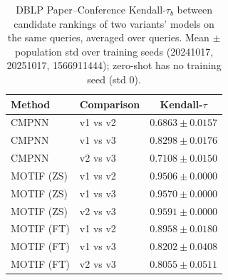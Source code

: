 \begin{table}[t]
\centering
\small
\begin{tabular}{||l||l||c||}
\hline
\textbf{Method} & \textbf{Comparison} & \textbf{Kendall-$\tau$} \\
\hline\hline
CMPNN & v1 vs v2 & $0.6863 \pm 0.0157$ \\
\hline
CMPNN & v1 vs v3 & $0.8298 \pm 0.0176$ \\
\hline
CMPNN & v2 vs v3 & $0.7108 \pm 0.0150$ \\
\hline
\hline
MOTIF (ZS) & v1 vs v2 & $0.9506 \pm 0.0000$ \\
\hline
MOTIF (ZS) & v1 vs v3 & $0.9570 \pm 0.0000$ \\
\hline
MOTIF (ZS) & v2 vs v3 & $0.9591 \pm 0.0000$ \\
\hline
\hline
MOTIF (FT) & v1 vs v2 & $0.8958 \pm 0.0180$ \\
\hline
MOTIF (FT) & v1 vs v3 & $0.8202 \pm 0.0408$ \\
\hline
MOTIF (FT) & v2 vs v3 & $0.8055 \pm 0.0511$ \\
\hline
\end{tabular}
\caption{DBLP Paper--Conference Kendall-$\tau_b$ between candidate rankings of two variants' models on the same queries, averaged over queries. Mean $\pm$ population std over training seeds (20241017, 20251017, 1566911444); zero-shot has no training seed (std 0). }
\label{tab:dblp_paper_conference_seed_invariance}
\end{table}
